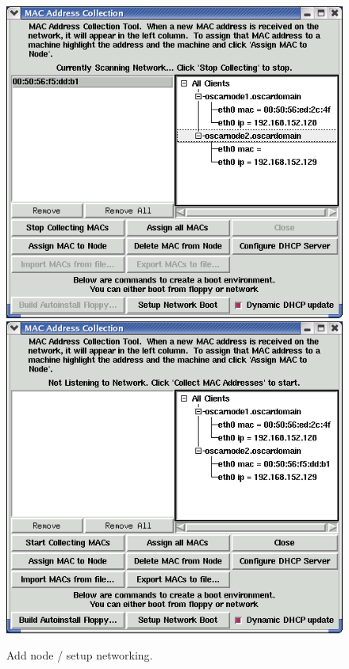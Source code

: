 \begin{figure}[!t]
  \begin{center}
    \centerline{
      \includegraphics[scale=\imgscale]{figs/9d_sbs-add-node-mac1}
      \hspace{\imghskip}
      \includegraphics[scale=\imgscale]{figs/9e_sbs-add-node-mac2}
      }
    \caption{Add node / setup networking.}
    \label{fig:sbs-add-node1-setup-network}
  \end{center}
\end{figure}

